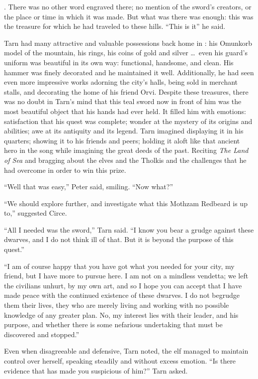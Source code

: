 
\emph{\kildir}.  There was no other word engraved there; no mention of the sword's creators, or the place or time in which it was made.  But what was there was enough: this was the treasure for which he had traveled to these hills.  ``This is it'' he said.

Tarn had many attractive and valuable possessions back home in \korbarthrond: his Omunkorb model of the mountain, his rings, his coins of gold and silver \ldots\ even his guard's uniform was beautiful in its own way: functional, handsome, and clean.  His hammer was finely decorated and he maintained it well.  Additionally, he had seen even more impressive works adorning the city's halls, being sold in merchant stalls, and decorating the home of his friend Orvi.  Despite these treasures, there was no doubt in Tarn's mind that this teal sword now in front of him was the most beautiful object that his hands had ever held.  It filled him with emotions: satisfaction that his quest was complete; wonder at the mystery of its origins and abilities; awe at its antiquity and its legend.  Tarn imagined displaying it in his quarters; showing it to his friends and peers; holding it aloft like that ancient hero in the song while imagining the great deeds of the past.  Reciting \emph{The Land of Sea} and bragging about the elves and the Tholkis and the challenges that he had overcome in order to win this prize.

``Well that was easy,'' Peter said, smiling.  ``Now what?''

``We should explore further, and investigate what this Mothzam Redbeard is up to,'' suggested Circe.

``All I needed was the sword,'' Tarn said.  ``I know you bear a grudge against these dwarves, and I do not think ill of that.  But it is beyond the purpose of this quest.''

``I am of course happy that you have got what you needed for your city, my friend, but I have more to pursue here.  I am not on a mindless vendetta; we left the civilians unhurt, by my own art, and so I hope you can accept that I have made peace with the continued existence of these dwarves.  I do not begrudge them their lives, they who are merely living and working with no possible knowledge of any greater plan.  No, my interest lies with their leader, and his purpose, and whether there is some nefarious undertaking that must be discovered and stopped.''

Even when disagreeable and defensive, Tarn noted, the elf managed to maintain control over herself, speaking steadily and without excess emotion. ``Is there evidence that has made you suspicious of him?''  Tarn asked.

